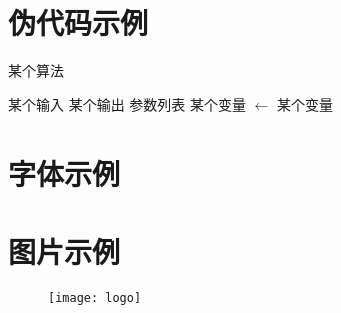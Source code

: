 \documentclass[a4paper,11pt,UTF8,AutoFakeBold]{ctexart}
\begin{document}
\begin{appendix}
\section{伪代码示例}

\begin{algorithm}
\caption{某个算法}
\begin{algorithmic}[1]  %
\Require 某个输入
\Ensure 某个输出
 {参数列表}
    \State 某个变量  $\gets$ 某个变量
\EndFunction
\end{algorithmic}
\end{algorithm}

\section{字体示例}

\section{图片示例}

\begin{figure}[!htbp]
\centering
\texttt{[image: logo]}
\end{figure}

\end{appendix}
\end{document}
